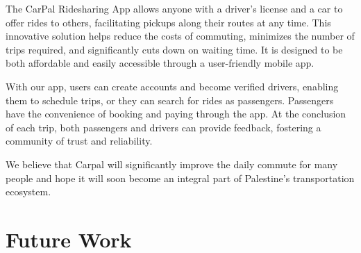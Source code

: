 \documentclass[a4paper, 12pt]{report} %
\begin{document}
        The CarPal Ridesharing App allows anyone with a driver's license and a car to offer rides to others, facilitating pickups along their routes at any time. This innovative solution helps reduce the costs of commuting, minimizes the number of trips required, and significantly cuts down on waiting time. It is designed to be both affordable and easily accessible through a user-friendly mobile app.

        With our app, users can create accounts and become verified drivers, enabling them to schedule trips, or they can search for rides as passengers. Passengers have the convenience of booking and paying through the app. At the conclusion of each trip, both passengers and drivers can provide feedback, fostering a community of trust and reliability.

        We believe that Carpal will significantly improve the daily commute for many people and hope it will soon become an integral part of Palestine's transportation ecosystem.
        
    \section{Future Work}



    \printbibliography
\end{document}
